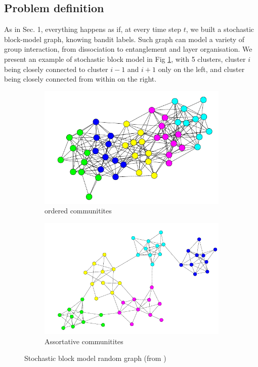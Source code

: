 \documentclass[11pt,a4paper]{article}
\begin{document}
\subsection{Problem definition}

As in Sec. 1, everything happens as if, at every time step $t$, we built a stochastic block-model graph, knowing bandit labels. Such graph can model a variety of group interaction, from dissociation to entanglement and layer organisation. We present an example of stochastic block model in Fig \ref{fig:sbm}, with 5 clusters, cluster $i$ being closely connected to cluster $i-1$ and $i+1$ only on the left, and cluster being closely connected from within on the right.

\begin{figure}[ht]
	\centering
	\begin{subfigure}{.49\textwidth}
		\includegraphics[width=\textwidth]{sbm}
		\caption{ordered communitites}
	\end{subfigure}
	\begin{subfigure}{.49\textwidth}
		\includegraphics[width=\textwidth]{assortative}
		\caption{Assortative communitites}
	\end{subfigure}
	\caption{Stochastic block model random graph (from \cite{sbm})}
	\label{fig:sbm}
\end{figure}
\end{document}

